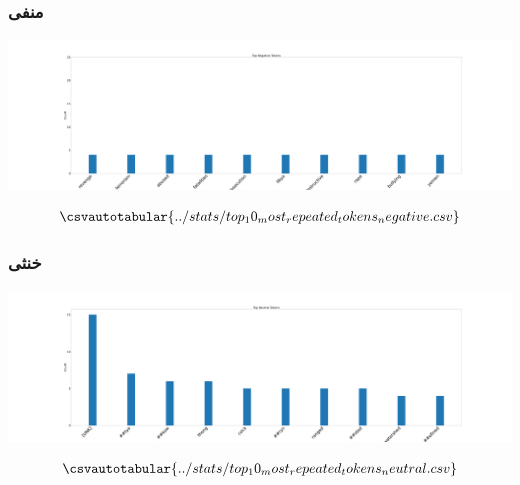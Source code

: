 {{		\subsubsection{\Large منفی}
		{ \setLR
			\begin{center}
				\includegraphics[scale=0.06]{../stats/top_10_most_repeated_tokens_negative.png}
			\end{center}
			\begin{align*}
				\csvautotabular{../stats/top_10_most_repeated_tokens_negative.csv}  
			\end{align*}
		}
		\newpage
		\subsubsection{\Large خنثی}
		{ \setLR
			\begin{center}
				\includegraphics[scale=0.06]{../stats/top_10_most_repeated_tokens_neutral.png}
			\end{center}
			\begin{align*}
				\csvautotabular{../stats/top_10_most_repeated_tokens_neutral.csv}  
			\end{align*}
		}
	}
	\newpage
		
}
